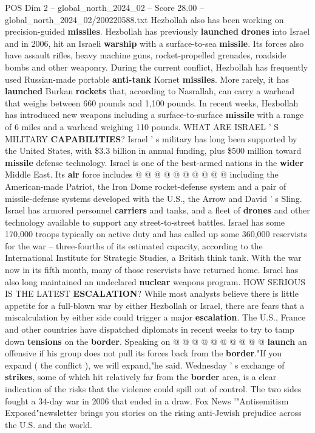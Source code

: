 \begin{textsample}{POS Dim 2 – global\_north\_2024\_02 – Score 28.00 – global\_north\_2024\_02/200220588.txt}
Hezbollah also has been working on precision-guided \textbf{missiles}.
Hezbollah has previously \textbf{launched} \textbf{drones} into Israel and in 2006, hit an Israeli \textbf{warship} with a surface-to-sea \textbf{missile}.
Its forces also have assault rifles, heavy machine guns, rocket-propelled grenades, roadside bombs and other weaponry.
During the current conflict, Hezbollah has frequently used Russian-made portable \textbf{anti-tank} Kornet \textbf{missiles}.
More rarely, it has \textbf{launched} Burkan \textbf{rockets} that, according to Nasrallah, can carry a warhead that weighs between 660 pounds and 1,100 pounds.
In recent weeks, Hezbollah has introduced new weapons including a surface-to-surface \textbf{missile} with a range of 6 miles and a warhead weighing 110 pounds.
WHAT ARE ISRAEL ' S MILITARY \textbf{CAPABILITIES}?
Israel ' s military has long been supported by the United States, with \$3.3 billion in annual funding, plus \$500 million toward \textbf{missile} defense technology.
Israel is one of the best-armed nations in the \textbf{wider} Middle East.
Its \textbf{air} force includes @ @ @ @ @ @ @ @ @ @ including the American-made Patriot, the Iron Dome rocket-defense system and a pair of missile-defense systems developed with the U.S., the Arrow and David ' s Sling.
Israel has armored personnel \textbf{carriers} and tanks, and a fleet of \textbf{drones} and other technology available to support any street-to-street battles.
Israel has some 170,000 troops typically on active duty and has called up some 360,000 reservists for the war -- three-fourths of its estimated capacity, according to the International Institute for Strategic Studies, a British think tank.
With the war now in its fifth month, many of those reservists have returned home.
Israel has also long maintained an undeclared \textbf{nuclear} weapons program.
HOW SERIOUS IS THE LATEST \textbf{ESCALATION}?
While most analysts believe there is little appetite for a full-blown war by either Hezbollah or Israel, there are fears that a miscalculation by either side could trigger a major \textbf{escalation}.
The U.S., France and other countries have dispatched diplomats in recent weeks to try to tamp down \textbf{tensions} on the \textbf{border}.
Speaking on @ @ @ @ @ @ @ @ @ @ \textbf{launch} an offensive if his group does not pull its forces back from the \textbf{border}."If you expand ( the conflict ), we will expand,"he said.
Wednesday ' s exchange of \textbf{strikes}, some of which hit relatively far from the \textbf{border} area, is a clear indication of the risks that the violence could spill out of control.
The two sides fought a 34-day war in 2006 that ended in a draw.
Fox News '"Antisemitism Exposed"newsletter brings you stories on the rising anti-Jewish prejudice across the U.S. and the world.

\end{textsample}

